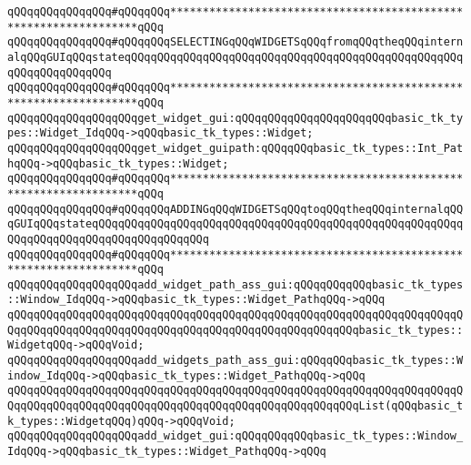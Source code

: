 \verb|qQQqqQQqqQQqqQQq#qQQqqQQq*****************************************************************qQQq|\newline
\verb|qQQqqQQqqQQqqQQq#qQQqqQQqSELECTINGqQQqWIDGETSqQQqfromqQQqtheqQQqinternalqQQqGUIqQQqstateqQQqqQQqqQQqqQQqqQQqqQQqqQQqqQQqqQQqqQQqqQQqqQQqqQQqqQQqqQQqqQQqqQQq|\newline
\verb|qQQqqQQqqQQqqQQq#qQQqqQQq*****************************************************************qQQq|\newline
\newline
\verb|qQQqqQQqqQQqqQQqqQQqget_widget_gui:qQQqqQQqqQQqqQQqqQQqqQQqbasic_tk_types::Widget_IdqQQq->qQQqbasic_tk_types::Widget;|\newline
\verb|qQQqqQQqqQQqqQQqqQQqget_widget_guipath:qQQqqQQqbasic_tk_types::Int_PathqQQq->qQQqbasic_tk_types::Widget;|\newline
\newline
\newline
\verb|qQQqqQQqqQQqqQQq#qQQqqQQq*****************************************************************qQQq|\newline
\verb|qQQqqQQqqQQqqQQq#qQQqqQQqADDINGqQQqWIDGETSqQQqtoqQQqtheqQQqinternalqQQqGUIqQQqstateqQQqqQQqqQQqqQQqqQQqqQQqqQQqqQQqqQQqqQQqqQQqqQQqqQQqqQQqqQQqqQQqqQQqqQQqqQQqqQQqqQQqqQQq|\newline
\verb|qQQqqQQqqQQqqQQq#qQQqqQQq*****************************************************************qQQq|\newline
\newline
\verb|qQQqqQQqqQQqqQQqqQQqadd_widget_path_ass_gui:qQQqqQQqqQQqbasic_tk_types::Window_IdqQQq->qQQqbasic_tk_types::Widget_PathqQQq->qQQq|\newline
\verb|qQQqqQQqqQQqqQQqqQQqqQQqqQQqqQQqqQQqqQQqqQQqqQQqqQQqqQQqqQQqqQQqqQQqqQQqqQQqqQQqqQQqqQQqqQQqqQQqqQQqqQQqqQQqqQQqqQQqqQQqqQQqbasic_tk_types::WidgetqQQq->qQQqVoid;|\newline
\verb|qQQqqQQqqQQqqQQqqQQqadd_widgets_path_ass_gui:qQQqqQQqbasic_tk_types::Window_IdqQQq->qQQqbasic_tk_types::Widget_PathqQQq->qQQq|\newline
\verb|qQQqqQQqqQQqqQQqqQQqqQQqqQQqqQQqqQQqqQQqqQQqqQQqqQQqqQQqqQQqqQQqqQQqqQQqqQQqqQQqqQQqqQQqqQQqqQQqqQQqqQQqqQQqqQQqqQQqqQQqqQQqList(qQQqbasic_tk_types::WidgetqQQq)qQQq->qQQqVoid;|\newline
\newline
\verb|qQQqqQQqqQQqqQQqqQQqadd_widget_gui:qQQqqQQqqQQqbasic_tk_types::Window_IdqQQq->qQQqbasic_tk_types::Widget_PathqQQq->qQQq|\newline
